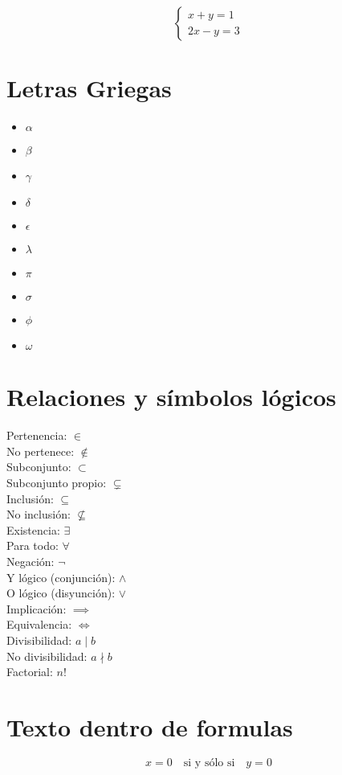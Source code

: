\documentclass{article} %
\begin{document}
\[
\begin{cases}
x + y = 1 \\
2x - y = 3
\end{cases}
\]

\section{Letras Griegas}
\begin{itemize}
  \item $\alpha$
  \item $\beta$
  \item $\gamma$
  \item $\delta$
  \item $\epsilon$
  \item $\lambda$
  \item $\pi$
  \item $\sigma$
  \item $\phi$
  \item $\omega$
\end{itemize}


\section{Relaciones y símbolos lógicos}

Pertenencia: $\in$ \\
No pertenece: $\notin$ \\
Subconjunto: $\subset$ \\
Subconjunto propio: $\subsetneq$ \\
Inclusión: $\subseteq$ \\
No inclusión: $\nsubseteq$ \\
Existencia: $\exists$ \\
Para todo: $\forall$ \\
Negación: $\neg$ \\
Y lógico (conjunción): $\land$ \\
O lógico (disyunción): $\lor$ \\
Implicación: $\implies$ \\
Equivalencia: $\iff$ \\
Divisibilidad: $a \mid b$ \\
No divisibilidad: $a \nmid b$ \\
Factorial: $n!$

\section{Texto dentro de formulas}
\[
x = 0 \quad \text{si y sólo si} \quad y = 0
\]
\end{document}
